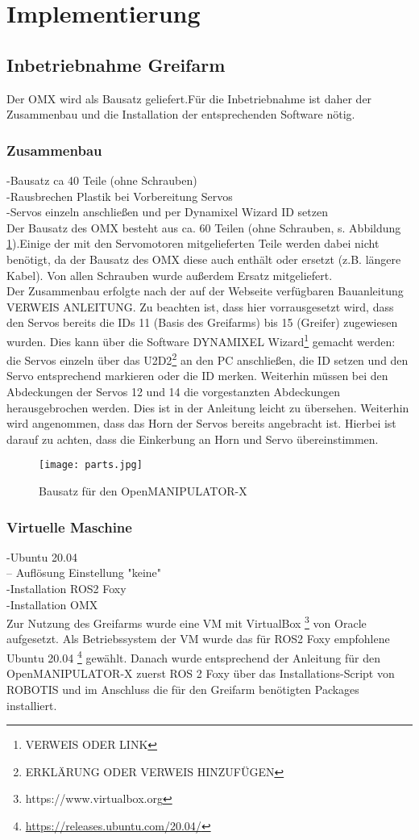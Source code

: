 \section{Implementierung}

\subsection {Inbetriebnahme Greifarm}
Der OMX wird als Bausatz geliefert.Für die Inbetriebnahme ist daher der Zusammenbau und die Installation der entsprechenden Software  nötig. 
\subsubsection{Zusammenbau}
-Bausatz ca 40 Teile (ohne Schrauben)\\
-Rausbrechen Plastik bei Vorbereitung Servos\\
-Servos einzeln anschließen und per Dynamixel Wizard ID setzen\\
Der Bausatz des OMX besteht aus ca. 60 Teilen (ohne Schrauben, s. Abbildung \ref{fig:omxparts}).Einige der mit den Servomotoren mitgelieferten Teile werden dabei nicht benötigt, da der Bausatz des OMX diese auch enthält oder ersetzt (z.B. längere Kabel). Von allen Schrauben wurde außerdem Ersatz mitgeliefert.\\
Der Zusammenbau erfolgte nach der auf der Webseite verfügbaren Bauanleitung VERWEIS ANLEITUNG. Zu beachten ist, dass hier vorrausgesetzt wird, dass den Servos bereits die IDs 11 (Basis des Greifarms) bis 15 (Greifer) zugewiesen wurden. Dies kann über die Software DYNAMIXEL Wizard{\footnote{VERWEIS ODER LINK}} gemacht werden: die Servos einzeln über das U2D2{\footnote{ERKLÄRUNG ODER VERWEIS HINZUFÜGEN}} an den PC anschließen, die ID setzen und den Servo entsprechend markieren oder die ID merken. Weiterhin müssen bei den Abdeckungen der Servos 12 und 14 die vorgestanzten Abdeckungen herausgebrochen werden. Dies ist in der Anleitung leicht zu übersehen. Weiterhin wird angenommen, dass das Horn der Servos bereits angebracht ist. Hierbei ist darauf zu achten, dass die Einkerbung an Horn und Servo übereinstimmen.
\begin{figure}[ht!]
\centering
\texttt{[image: parts.jpg]}
\caption{Bausatz für den OpenMANIPULATOR-X}
\label{fig:omxparts}
\end{figure}
\subsubsection{Virtuelle Maschine}
-Ubuntu 20.04\\
-- Auflösung Einstellung "keine"\\
-Installation ROS2 Foxy\\
-Installation OMX\\
Zur Nutzung des Greifarms wurde eine \ac{VM} mit VirtualBox {\footnote{https://www.virtualbox.org}} von Oracle aufgesetzt. Als Betriebssystem der \ac{VM} wurde das für ROS2 Foxy empfohlene \citep{foxyreq} Ubuntu 20.04 {\footnote{\url{https://releases.ubuntu.com/20.04/}}} gewählt. Danach wurde entsprechend der Anleitung für den OpenMANIPULATOR-X \citep{foxyinstall} zuerst ROS 2 Foxy über das Installations-Script von ROBOTIS und im Anschluss die für den Greifarm benötigten Packages installiert.
